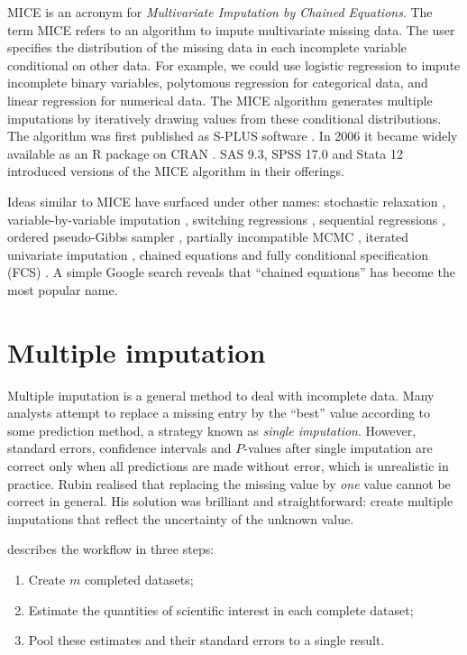 \documentclass[
]{book}
\providecommand{\tightlist}{%
  \setlength{\itemsep}{0pt}\setlength{\parskip}{0pt}}
\begin{document}
MICE is an acronym for \emph{Multivariate Imputation by Chained Equations}. The term MICE refers to an algorithm to impute multivariate missing data. The user specifies the distribution of the missing data in each incomplete variable conditional on other data. For example, we could use logistic regression to impute incomplete binary variables, polytomous regression for categorical data, and linear regression for numerical data. The MICE algorithm generates multiple imputations by iteratively drawing values from these conditional distributions. The algorithm was first published as S-PLUS software \citep{VANBUUREN1999B}. In 2006 it became widely available as an R package on CRAN \citep{VANBUUREN2011}. SAS 9.3, SPSS 17.0 and Stata 12 introduced versions of the MICE algorithm in their offerings.

Ideas similar to MICE have surfaced under other names: stochastic relaxation \citep{KENNICKELL1991}, variable-by-variable imputation \citep{BRAND1999}, switching regressions \citep{VANBUUREN1999}, sequential regressions \citep{RAGHUNATHAN2001}, ordered pseudo-Gibbs sampler \citep{HECKERMAN2001}, partially incompatible MCMC \citep{RUBIN2003}, iterated univariate imputation \citep{GELMAN2004}, chained equations \citep{VANBUUREN1999B} and fully conditional specification (FCS) \citep{VANBUUREN2006}. A simple Google search reveals that ``chained equations'' has become the most popular name.

\hypertarget{multiple-imputation}{%
\section{Multiple imputation}\label{multiple-imputation}}

Multiple imputation \citep{RUBIN1987} is a general method to deal with incomplete data. Many analysts attempt to replace a missing entry by the ``best'' value according to some prediction method, a strategy known as \emph{single imputation}. However, standard errors, confidence intervals and \(P\)-values after single imputation are correct only when all predictions are made without error, which is unrealistic in practice. Rubin realised that replacing the missing value by \emph{one} value cannot be correct in general. His solution was brilliant and straightforward: create multiple imputations that reflect the uncertainty of the unknown value.

\citet{RUBIN1987} describes the workflow in three steps:

\begin{enumerate}
\def\labelenumi{\arabic{enumi}.}
\tightlist
\item
  Create \(m\) completed datasets;
\item
  Estimate the quantities of scientific interest in each complete dataset;
\item
  Pool these estimates and their standard errors to a single result.
\end{enumerate}
\end{document}
